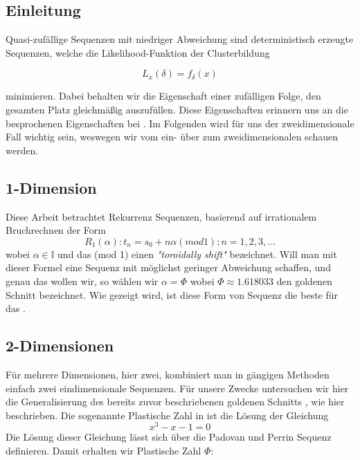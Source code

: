 \cite{owen1998scrambling} \cite{heitz:hal02150657}


\subsection{Einleitung}
Quasi-zufällige Sequenzen mit niedriger Abweichung sind deterministisch 
erzeugte Sequenzen, welche die Likelihood-Funktion der Clusterbildung

\begin{equation}\label{eq:Likeli-Hood-Gleichung}
    L_{x}(\delta) = f_{\delta}(x)
\end{equation}

minimieren. Dabei behalten wir die Eigenschaft einer zufälligen Folge, 
den gesamten Platz gleichmäßig auszufüllen. Diese Eigenschaften erinnern
uns an die besprochenen Eigenschaften bei .
Im Folgenden wird für uns der zweidimensionale Fall wichtig sein, weswegen
wir vom ein- über zum zweidimensionalen schauen werden.

\label{subsec:onedimensional}
\subsection{1-Dimension}
Diese Arbeit betrachtet Rekurrenz Sequenzen, basierend auf irrationalem 
Bruchrechnen der Form
\begin{equation}\label{eq:Rekurrenz Sequenz}
    R_{1}(\alpha) : t_n = s_0 + n\alpha(mod 1); n = 1,2,3,...
\end{equation}
wobei $\alpha \in \mathbb{I}$ und das (mod 1) einen \textit{"toroidally shift"}
bezeichnet. Will man mit dieser Formel eine Sequenz mit möglichst geringer
Abweichung schaffen, und genau das wollen wir, so wählen wir 
$\alpha = \Phi$ wobei $\Phi \approx 1.618033$ den goldenen Schnitt bezeichnet.
Wie \cite{quasirandomsequencesbyRoberts} gezeigt wird, ist diese Form von 
Sequenz die beste für das .  

\subsection{2-Dimensionen}

Für mehrere Dimensionen, hier zwei, kombiniert man in gängigen Methoden 
einfach zwei  eindimensionale Sequenzen.
Für unsere Zwecke untersuchen wir hier die Generalisierung des bereits 
zuvor beschriebenen goldenen Schnitts , wie
hier \cite{krcadinac2006new} beschrieben. 
Die sogenannte Plastische Zahl in ist die Lösung der
Gleichung 
\begin{equation}\label{eq:kubisch}
   x^{3} - x - 1 = 0
\end{equation}
Die Lösung dieser Gleichung lässt sich über die Padovan und Perrin Sequenz
definieren. Damit erhalten wir Plastische Zahl $\Phi$:

